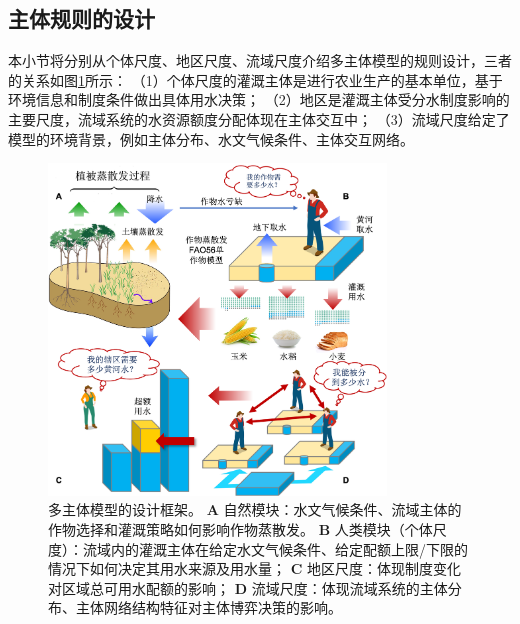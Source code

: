 
\subsection{主体规则的设计}

本小节将分别从个体尺度、地区尺度、流域尺度介绍多主体模型的规则设计，三者的关系如图\ref{ch6:fig:framework}所示：
（1）个体尺度的灌溉主体是进行农业生产的基本单位，基于环境信息和制度条件做出具体用水决策；
（2）地区是灌溉主体受分水制度影响的主要尺度，流域系统的水资源额度分配体现在主体交互中；
（3）流域尺度给定了模型的环境背景，例如主体分布、水文气候条件、主体交互网络。

\begin{figure}[!ht]
    \centering
    \includegraphics[width=0.8\textwidth]{img/ch6/ch6_framework.png}
    \caption[多主体模型的设计框架]{多主体模型的设计框架。
        \textbf{A} 自然模块：水文气候条件、流域主体的作物选择和灌溉策略如何影响作物蒸散发。
        \textbf{B} 人类模块（个体尺度）：流域内的灌溉主体在给定水文气候条件、给定配额上限/下限的情况下如何决定其用水来源及用水量；
        \textbf{C} 地区尺度：体现制度变化对区域总可用水配额的影响；
        \textbf{D} 流域尺度：体现流域系统的主体分布、主体网络结构特征对主体博弈决策的影响。
    }\label{ch6:fig:framework}
\end{figure}


